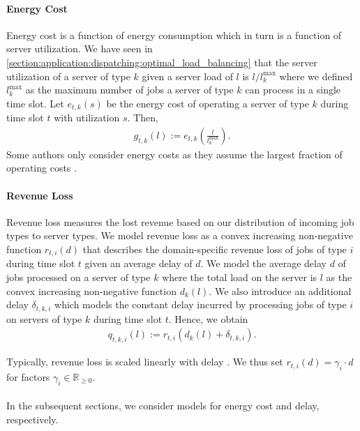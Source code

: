 \paragraph{Energy Cost} Energy cost is a function of energy consumption which in turn is a function of server utilization. We have seen in \autoref{section:application:dispatching:optimal_load_balancing} that the server utilization of a server of type $k$ given a server load of $l$ is $l / l_k^{\text{max}}$ where we defined $l_k^{\text{max}}$ as the maximum number of jobs a server of type $k$ can process in a single time slot. Let $e_{t,k}(s)$ be the energy cost of operating a server of type $k$ during time slot $t$ with utilization $s$. Then, \begin{align*}
    g_{t,k}(l) := e_{t,k}\left(\frac{l}{l_k^{\text{max}}}\right).
\end{align*} Some authors only consider energy costs as they assume the largest fraction of operating costs \cite{Bansal2015}.

\paragraph{Revenue Loss} Revenue loss measures the lost revenue based on our distribution of incoming job types to server types. We model revenue loss as a convex increasing non-negative function $r_{t,i}(d)$ that describes the domain-specific revenue loss of jobs of type $i$ during time slot $t$ given an average delay of $d$. We model the average delay $d$ of jobs processed on a server of type $k$ where the total load on the server is $l$ as the convex increasing non-negative function $d_{k}(l)$. We also introduce an additional delay $\delta_{t,k,i}$ which models the constant delay incurred by processing jobs of type $i$ on servers of type $k$ during time slot $t$. Hence, we obtain \begin{align*}
    q_{t,k,i}(l) := r_{t,i}(d_{k}(l) + \delta_{t,k,i}).
\end{align*}

Typically, revenue loss is scaled linearly with delay \cite{Lin2011}. We thus set $r_{t,i}(d) = \gamma_i \cdot d$ for factors $\gamma_i \in \mathbb{R}_{\geq 0}$.

\paragraph{} In the subsequent sections, we consider models for energy cost and delay, respectively.


